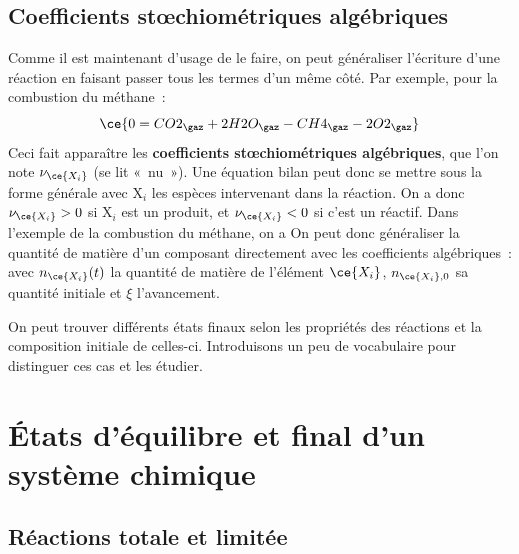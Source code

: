 \documentclass[../../main/main.tex]{subfiles}
\begin{document}
\subsection{Coefficients stœchiométriques algébriques}

Comme il est maintenant d'usage de le faire, on peut généraliser l'écriture
d'une réaction en faisant passer tous les termes d'un même côté. Par exemple,
pour la combustion du méthane~:
\[
	\ce{0 = CO2_{\gaz} + 2H2O_{\gaz} - CH4_{\gaz} - 2O2_{\gaz}}
\]
Ceci fait apparaître les \textbf{coefficients stœchiométriques algébriques}, que
l'on note $\nu_{\ce{X_i}}$ (se lit «~nu~»). Une équation bilan peut donc se
mettre sous la forme générale
\psw{%
	\[
		\boxed{\sum_i \nu_{\ce{X_i}}\mathrm{X}_i = 0}
	\]
}
avec $\mathrm{X}_i$ les espèces intervenant dans la réaction. On a donc
$\nu_{\ce{X_i}} >0$ si $\mathrm{X}_i$ est un produit, et $\nu_{\ce{X_i}} < 0$ si
c'est un réactif. Dans l'exemple de la combustion du méthane, on a
\psw{%
	\[
		\begin{array}{rcl}
			\nu_{\ce{CH4}} = -1 & \qquad \text{et} & \qquad \nu_{\ce{O2}} = -2 \\
			\nu_{\ce{CO2}} = 1  & \qquad \text{et} & \qquad \nu_{\ce{H20}} = 2
		\end{array}
	\]
}
On peut donc généraliser la quantité de matière d'un composant directement avec
les coefficients algébriques~:
\psw{%
	\[
		\boxed{n_{\ce{X_i}}(t) = n_{\ce{X_i},0} + \nu_{\ce{X_i}}\xi(t)}
	\]
}
avec $n_{\ce{X_i}}(t)$ la quantité de matière de l'élément $\ce{X_i}$,
$n_{\ce{X_i},0}$ sa quantité initiale et $\xi$ l'avancement.

On peut trouver différents états finaux selon les propriétés des réactions
et la composition initiale de celles-ci. Introduisons un peu de vocabulaire
pour distinguer ces cas et les étudier.

\section{États d'équilibre et final d'un système chimique}
\subsection{Réactions totale et limitée}
\end{document}
